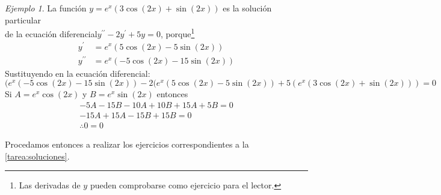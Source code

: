 \documentclass[12pt]{article} %
\theoremstyle{remark} %
\newcounter{ejercicio}[tarea]
\newtheorem{ejemplo}{Ejemplo}[section]
\newcommand{\ed}{ecuación diferencial}
\begin{document}
\begin{ejemplo}
  La función $y = e^x (3 \cos (2x) + \sin (2x))$ es la solución particular \\
  de la \ed $y^{\prime \prime} - 2y^{\prime} + 5y = 0$, 
  porque\footnote{Las derivadas de $y$ pueden comprobarse como ejercicio para el lector.}
  \begin{align*}
    y^{\prime} &= e^x (5 \cos (2x) - 5 \sin (2x)) \\
    y^{\prime \prime} &= e^x (-5 \cos (2x) - 15 \sin (2x))
  \end{align*}
  Sustituyendo en la \ed :
  \[(e^x(-5 \cos (2x) -15 \sin (2x)) - 2(e^x(5 \cos (2x) -5 \sin (2x)) 
  +5(e^x(3 \cos (2x) + \sin (2x))) = 0\]
  Si $A = e^x \cos(2x)$ y $B = e^x \sin(2x)$ entonces
  \begin{gather*}
    -5A - 15B -10A + 10B +15A + 5B = 0\\
    -15A + 15A -15B + 15 B = 0\\
    \therefore 0 = 0
  \end{gather*}
\end{ejemplo}

Procedamos entonces a realizar los ejercicios correspondientes a la \cref{tarea:soluciones}.
\end{document}
